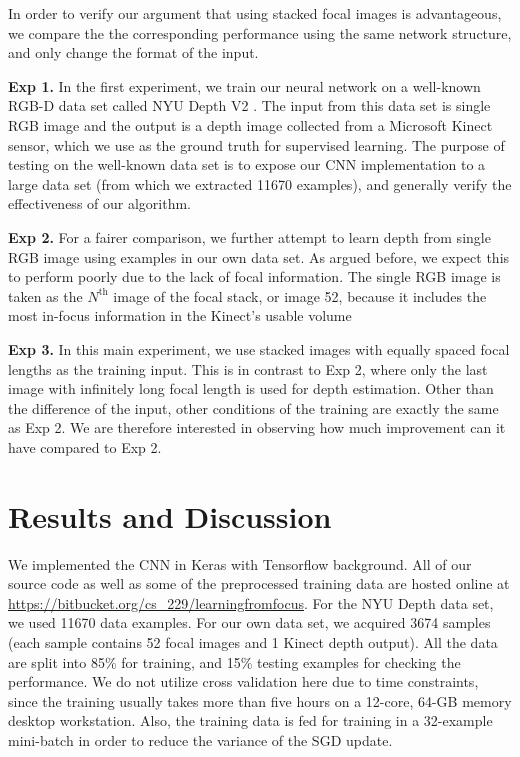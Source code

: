\documentclass[letterpaper, 10 pt, conference]{ieeeconf}  %
\begin{document}
In order to verify our argument that using stacked focal images is advantageous, we compare the the corresponding performance using the same network structure, and only change the format of the input.

\textbf{Exp 1.} In the first experiment, we train our neural network on a well-known RGB-D data set called NYU Depth V2 \cite{eigen2014depth}. The input from this data set is single RGB image and the output is a depth image collected from a Microsoft Kinect sensor, which we use as the ground truth for supervised learning. The purpose of testing on the well-known data set is to expose our CNN implementation to a large data set (from which we extracted 11670 examples), and generally verify the effectiveness of our algorithm. 

\textbf{Exp 2.} For a fairer comparison, we further attempt to learn depth from single RGB image using examples in our own data set. As argued before, we expect this to perform poorly due to the lack of focal information. The single RGB image is taken as the $N^{\mathrm{th}}$ image of the focal stack, or image 52, because it includes the most in-focus information in the Kinect's usable volume

\textbf{Exp 3.} In this main experiment, we use stacked images with equally spaced focal lengths as the training input. This is in contrast to Exp 2, where only the last image with infinitely long focal length is used for depth estimation. Other than the difference of the input, other conditions of the training are exactly the same as Exp 2. We are therefore interested in observing how much improvement can it have compared to Exp 2. 

\section{Results and Discussion}
\label{sec:results}
We implemented the CNN in Keras \cite{chollet2015keras} with Tensorflow \cite{abadi2016tensorflow} background. All of our source code as well as some of the preprocessed training data are hosted online at \url{https://bitbucket.org/cs_229/learningfromfocus}. For the NYU Depth data set, we used 11670 data examples. For our own data set, we acquired 3674 samples (each sample contains 52 focal images and 1 Kinect depth output). All the data are split into 85\% for training, and 15\% testing examples for checking the performance. We do not utilize cross validation here due to time constraints, since the training usually takes more than five hours on a 12-core, 64-GB memory desktop workstation. Also, the training data is fed for training in a 32-example mini-batch in order to reduce the variance of the SGD update. 
\end{document}
